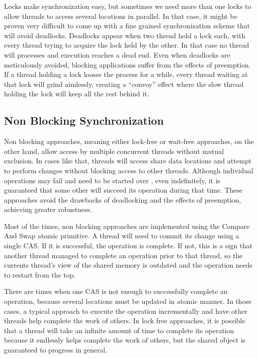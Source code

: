 Locks make synchronization easy, but sometimes we need more than one locks to allow threads to access several locations in parallel. In that case, it might be proven very difficult to come up with a fine grained synchronization scheme that will avoid deadlocks. Deadlocks appear when two thread hold a lock each, with every thread trying to acquire the lock held by the other. In that case no thread will processes and execution reaches a dead end. Even when deadlocks are meticulously avoided, blocking applications suffer from  the effects of preemption. If a thread holding a lock looses the process for a while, every thread waiting at that lock will grind aimlessly, creating a “convoy” effect where the slow thread holding the lock will keep all the rest behind it.

\subsection{Non Blocking Synchronization}

Non blocking approaches, meaning either lock-free or wait-free approaches, on the other hand, allow access by multiple concurrent threads without mutual exclusion. In cases like that, threads will access share data locations and attempt to perform changes without blocking access to other threads. Although individual operations may fail and need to be started over , even indefinitely, it is guaranteed that some other will succeed its operation during that time. These approaches avoid the drawbacks of deadlocking and the effects of preemption, achieving greater robustness.

Most of the times, non blocking approaches are implemented using the Compare And Swap atomic primitive. A thread will need to commit its change using a single CAS. If it is successful, the operation is complete. If not, this is a sign that another thread managed to complete an operation prior to that thread, so the currents thread's view of the shared memory is outdated and the operation needs to restart from the top.

There are times when one CAS is not enough to successfully complete an operation, because several locations must be updated in atomic manner. In those cases, a typical approach to execute the operation  incrementally and have other threads help complete the work of others. In lock free approaches, it is possible that a thread will take an infinite amount of time to complete its operation because it endlessly helps complete the work of others, but the shared object is guaranteed to progress in general.

